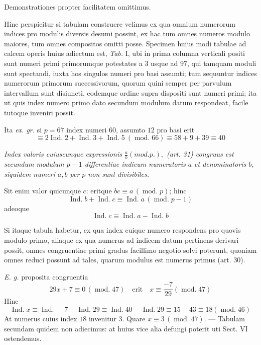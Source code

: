 Demonstrationes propter facilitatem omittimus.

Hinc perspicitur si tabulam construere velimus ex qua omnium numerorum indices pro modulis diversis desumi possint, ex hac tum omnes numeros modulo maiores, tum omnes compositos omitti posse. Specimen huius modi tabulae ad calcem operis huius adiectum est, \emph{Tab.} I, ubi in prima columna verticali positi sunt numeri primi primorumque potestates a $3$ usque ad $97$, qui tamquam moduli sunt spectandi, iuxta hos singulos numeri pro basi assumti; tum sequuntur indices numerorum primorum successivorum, quorum quini semper per parvulum
intervallum sunt disiuncti, eodemque ordine supra dispositi sunt numeri primi; ita ut quis index numero primo dato secundum modulum datum respondeat, facile tutoque inveniri possit.

Ita \emph{ex. gr.} si $p=67$ index numeri $60$, assumto $12$ pro basi erit
\[\equiv2\operatorname{Ind.}2+\operatorname{Ind.}3+\operatorname{Ind.}5\ (\operatorname{mod.}66)\equiv58+9+39\equiv40\]

\emph{Index valoris cuiuscunque expressionis $\frac{a}{b}(\mathit{mod.}p.),$ (art. 31) congruus est secundum modulum $p-1$ differentiae indicum numeratoris $a$ et denominatoris $b$, siquidem numeri $a,b$ per $p$ non sunt divisibiles.}

Sit enim valor quicunque $c$: eritque $bc\equiv a\,(\operatorname{mod.}p)$; hinc
\[\operatorname{Ind.}b+\operatorname{Ind.}c\equiv\operatorname{Ind.}a\,(\operatorname{mod.}p-1)\]
adeoque
\[\operatorname{Ind.}c\equiv\operatorname{Ind.}a-\operatorname{Ind.}b\]

Si itaque tabula habetur, ex qua index cuique numero respondens pro quovis modulo primo, aliaque ex qua numerus ad indicem datum pertinens derivari possit, omnes congruentiae primi gradus facillimo negotio solvi poterunt, quoniam omnes reduci possunt ad tales, quarum modulus est numerus primus (art. 30).

\emph{E. g.} proposita congruentia
\[29x+7\equiv0\,(\operatorname{mod.}47)\quad\text{erit}\quad x\equiv\frac{-7}{29}(\operatorname{mod.}47)\]
Hinc
\[\operatorname{Ind.}x\equiv\operatorname{Ind.}-7-\operatorname{Ind.}29\equiv\operatorname{Ind.}40-\operatorname{Ind.}29\equiv15-43\equiv18(\operatorname{mod.}46)\]
At numerus cuius index $18$ invenitur $3$. Quare $x\equiv3\,(\operatorname{mod.}47)$. --- Tabulam secundam quidem non adiecimus: at huius vice alia defungi poterit uti Sect. VI ostendemus.

